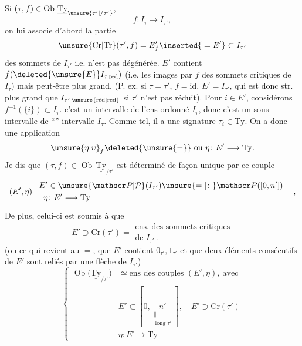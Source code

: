 Si $(\tau,f)\in\operatorname{Ob}\,\underline{\mathrm{Ty}}_{\unsure{\tau'|/\tau'}}$, 
\[
 f\colon I_\tau\longrightarrow I_{\tau'},
\]
on lui associe  d'abord la partie
\[
 \unsure{\mathrm{Cr}|\mathrm{Tr}}(\tau',f)=E'_f\inserted{{}=E'}\subset I_{\tau'}
\]
 des sommets 
de $I_{\tau'}$ 
i.e.   n'est pas dégénérée.
 $E'$
contient 
$f(\deleted{\unsure{E}} I_{\tau\,\mathrm{red}})$ (i.e.
les images par $f$ des sommets critiques de $I_\tau$)
mais peut-être plus grand. (P. ex. si $\tau=\tau'$, $f=\mathrm{id}$,
 $E'=I_{\tau'}$, qui est donc str. plus grand que $I_{\tau'\,\unsure{\mathrm{r\acute ed}|\mathrm{red}}}$
si $\tau'$ n'est pas réduit). Pour  $i\in E'$,
considérons $f^{-1}(\{i\})\subset I_\tau$.  c'est un intervalle
de l'ens  ordonné $I_\tau$, donc c'est un sous-intervalle
de  ``'' intervalle $I_\tau$. Comme
tel, il a une signature $\tau_i\in\mathrm{Ty}$. On a donc
une application
\[
 \unsure{\eta|\upsilon}_f\deleted{\unsure{=}}\ \text{ou }\eta\colon E'\longrightarrow\mathrm{Ty}.
\]
Je dis que $(\tau,f)\in\operatorname{Ob}\,\underline{\mathrm{Ty}}_{/\tau'}$ est déterminé de
façon unique par ce couple
\[
 (E',\eta)\ \left|\begin{aligned}
 E'&\in\unsure{\mathscr P|\mathcal P}(I_{\tau'})\unsure{=|\colon}\mathscr P([0,n'])\\
 \eta&\colon E'\longrightarrow\mathrm{Ty}
 \end{aligned}\right.\quad,
\]
De plus, celui-ci est soumis à
  que 
\[
 E'\supset\mathrm{Cr}(\tau')=\substack{\text{ens. des sommets critiques}\\\text{de }I_{\tau'}\, .}
\]
(ou ce qui revient au $=$, que $E'$ contient $0_{\tau'},1_{\tau'}$
et que deux éléments consécutifs de $E'$ sont
reliés par une flèche de $I_{\tau'}$)\unsure{;|:} 
\[
 \left\{\begin{aligned}
 \operatorname{Ob}\big(\underline{\mathrm{Ty}}_{/\tau'}\big)&\simeq\text{ens des couples }(E',\eta),\ \text{avec}\\
 &E'\subset[0,\underset{\substack{\parallel\\\operatorname{long}\tau'}}{n'}],\quad E'\supset\mathrm{Cr}(\tau')\\
 &\eta\colon E'\longrightarrow\mathrm{Ty}
 \end{aligned}\right.
\]
